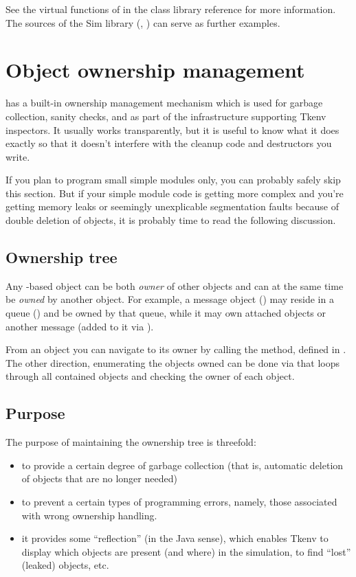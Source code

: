 See the virtual functions of  in the class library reference
for more information. The sources of the Sim library (,
) can serve as further examples.




\section{Object ownership management}
\label{sec:ch-sim-lib:ownership-management}

{\opp} has a built-in ownership management mechanism which
is used for garbage collection, sanity checks, and as
part of the infrastructure supporting Tkenv inspectors.
It usually works transparently, but it is useful to know
what it does exactly so that it doesn't interfere
with the cleanup code and destructors you write.

If you plan to program small simple modules only, you can probably
safely skip this section. But if your simple module code
is getting more complex and you're getting memory leaks or seemingly
unexplicable segmentation faults because of double deletion of objects,
it is probably time to read the following discussion.


\subsection{Ownership tree}

Any -based object can be both \textit{owner} of other
objects and can at the same time be \textit{owned} by another object.
For example, a message object () may reside
in a queue () and be owned by that queue, while it
may own attached  objects or another message
(added to it via ).

From an object you can navigate to its owner by calling the 
method, defined in . The other direction, enumerating the
objects owned can be done via  that loops through all
contained objects and checking the owner of each object.


\subsection{Purpose}

The purpose of maintaining the ownership tree is threefold:

\begin{itemize}
    \item{to provide a certain degree of garbage collection (that is,
    automatic deletion of objects that are no longer needed)}

    \item{to prevent a certain types of programming errors, namely,
    those associated with wrong ownership handling.}

    \item{it provides some ``reflection'' (in the Java sense), which
    enables Tkenv to display which objects are present (and where)
    in the simulation, to find ``lost'' (leaked) objects, etc.}
\end{itemize}

